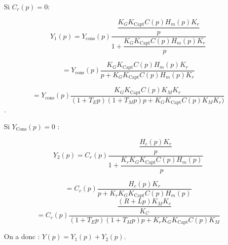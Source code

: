 \begin{multicols}{2}
\begin{corrige}
Si $C_r (p)=0$: 

$$Y_1 (p)
=Y_{\text{cons}}(p) \dfrac{\dfrac{K_G K_{\text{Capt}} C(p) H_m (p) K_r}{p}}{1+\dfrac{K_G K_{\text{Capt}} C(p) H_m (p) K_r}{p}}$$

$$
=Y_{\text{cons}} (p) \dfrac{K_G K_{\text{Capt}} C(p) H_m (p) K_r}{p+K_G K_{\text{Capt}} C(p) H_m (p) K_r } 
$$

$$
=Y_{\text{cons}} (p) \dfrac{K_G K_{\text{Capt}} C(p) K_M  K_r}{(1+T_E p)(1+T_M p)p+K_G K_{\text{Capt}} C(p) K_M K_r )}$$.

\end{corrige}

\begin{corrige}
Si $Y_{\text{Cons}} (p)=0$ :

$$Y_2 (p)
=C_r (p) \dfrac{\dfrac{H_c (p) K_r}{p}}{1+\dfrac{K_r K_G K_{\text{Capt}} C(p) H_m (p)}{p} }$$

$$
=C_r (p) \dfrac{H_c (p) K_r}{p+K_r K_G K_{\text{Capt}} C(p) H_m (p) }$$
$$
=C_r (p) \dfrac{\dfrac{(R+Lp) K_M  K_r}{K_C }}{(1+T_E p)(1+T_M p)p+K_r K_G K_{\text{Capt}} C(p) K_M }$$

On a donc :
$Y(p)=Y_1 (p)+Y_2 (p)$.

\end{corrige}
\else
\fi

\ifprof
\begin{corrige}
\end{corrige}
\else
\fi


\ifprof
\begin{corrige}
\end{corrige}
\else
\fi


\ifprof
\begin{corrige}
\end{corrige}
\else
\fi


\ifprof
\begin{corrige}
\end{corrige}
\else
\fi


\end{multicols}
